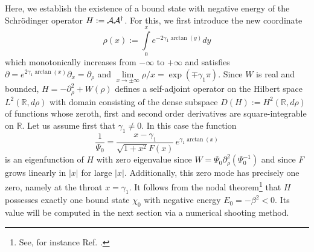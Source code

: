 \documentclass[           %
               showpacs,            %
               preprintnumbers,     %
               aps,                 %
               prd,                 %
               superscriptaddress,      %
               nofootinbib,         %
               tightenlines,        %
               floats,floatfix      %
               ]{revtex4}
\newcommand{\Real}{\mathbb{R}}
\begin{document}
Here, we establish the existence of a bound state with negative energy
of the Schr\"odinger operator $H := {\cal A}{\cal A}^\dagger$. For
this, we first introduce the new coordinate
\begin{displaymath}
\rho(x) := \int\limits_0^x e^{-2\gamma_1\arctan(y)} dy
\end{displaymath}
which monotonically increases from $-\infty$ to $+\infty$ and
satisfies $\partial = e^{2\gamma_1\arctan(x)}\partial_x =
\partial_\rho$ and $\lim\limits_{x\to\pm\infty} \rho/x =
\exp(\mp\gamma_1\pi)$. Since $W$ is real and bounded, $H =
-\partial_\rho^2 + W(\rho)$ defines a self-adjoint operator on the
Hilbert space $L^2(\Real,d\rho)$ with domain consisting of the dense
subspace $D(H) := H^2(\Real,d\rho)$ of functions whose zeroth, first
and second order derivatives are square-integrable on $\Real$. Let us
assume first that $\gamma_1 \neq 0$. In this case the function
\begin{equation}
\frac{1}{\Psi_0} 
 = \frac{x-\gamma_1}{\sqrt{1+x^2} F(x)}\, e^{\gamma_1\arctan(x)}
\label{Eq:ZeroMode}
\end{equation}
is an eigenfunction of $H$ with zero eigenvalue since $W =
\Psi_0\partial_\rho^2(\Psi_0^{-1})$ and since $F$ grows linearly in
$|x|$ for large $|x|$. Additionally, this zero mode has precisely one
zero, namely at the throat $x = \gamma_1$. It follows from the nodal
theorem\footnote{See, for instance Ref. \cite{CourantHilbert-Book}.}
that $H$ possesses exactly one bound state $\chi_0$ with
negative energy $E_0 = -\beta^2 < 0$. Its value will be computed in
the next section via a numerical shooting method.
\end{document}
